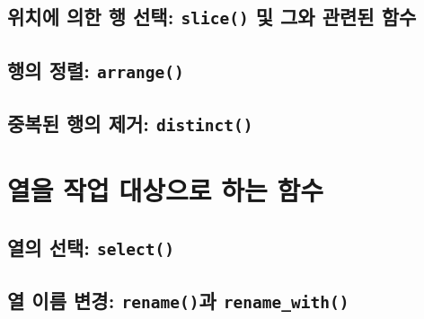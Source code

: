 \documentclass[
]{book}
\begin{document}
\hypertarget{uxc704uxce58uxc5d0-uxc758uxd55c-uxd589-uxc120uxd0dd-slice-uxbc0f-uxadf8uxc640-uxad00uxb828uxb41c-uxd568uxc218}{%
\subsection{\texorpdfstring{위치에 의한 행 선택: \texttt{slice()} 및 그와 관련된 함수}{위치에 의한 행 선택: slice() 및 그와 관련된 함수}}\label{uxc704uxce58uxc5d0-uxc758uxd55c-uxd589-uxc120uxd0dd-slice-uxbc0f-uxadf8uxc640-uxad00uxb828uxb41c-uxd568uxc218}}

\hypertarget{uxd589uxc758-uxc815uxb82c-arrange}{%
\subsection{\texorpdfstring{행의 정렬: \texttt{arrange()}}{행의 정렬: arrange()}}\label{uxd589uxc758-uxc815uxb82c-arrange}}

\hypertarget{uxc911uxbcf5uxb41c-uxd589uxc758-uxc81cuxac70-distinct}{%
\subsection{\texorpdfstring{중복된 행의 제거: \texttt{distinct()}}{중복된 행의 제거: distinct()}}\label{uxc911uxbcf5uxb41c-uxd589uxc758-uxc81cuxac70-distinct}}

\hypertarget{uxc5f4uxc744-uxc791uxc5c5-uxb300uxc0c1uxc73cuxb85c-uxd558uxb294-uxd568uxc218}{%
\section{열을 작업 대상으로 하는 함수}\label{uxc5f4uxc744-uxc791uxc5c5-uxb300uxc0c1uxc73cuxb85c-uxd558uxb294-uxd568uxc218}}

\hypertarget{uxc5f4uxc758-uxc120uxd0dd-select}{%
\subsection{\texorpdfstring{열의 선택: \texttt{select()}}{열의 선택: select()}}\label{uxc5f4uxc758-uxc120uxd0dd-select}}

\hypertarget{uxc5f4-uxc774uxb984-uxbcc0uxacbd-renameuxacfc-rename_with}{%
\subsection{\texorpdfstring{열 이름 변경: \texttt{rename()}과 \texttt{rename\_with()}}{열 이름 변경: rename()과 rename\_with()}}\label{uxc5f4-uxc774uxb984-uxbcc0uxacbd-renameuxacfc-rename_with}}
\end{document}
